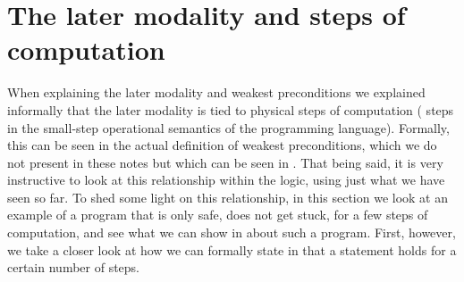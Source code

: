 
\section{The later modality and steps of computation}
\label{sec:later-steps}

When explaining the later modality and weakest preconditions we explained informally that
the later modality is tied to physical steps of computation (\ie{} steps in the small-step operational semantics of the programming language).
Formally, this can be seen in the actual definition of weakest preconditions, which we do not present in these notes but which can be seen in \cite{iris-ground-up}.
That being said, it is very instructive to look at this relationship within the logic, \ie{} using just what we have seen so far.
To shed some light on this relationship, in this section we look at an example of a program that is only safe, \ie{} does not get stuck, for a few steps of computation, and see what we can show in \Iris{} about such a program.
First, however, we take a closer look at how we can formally state in \Iris{} that a statement holds for a certain number of steps.

